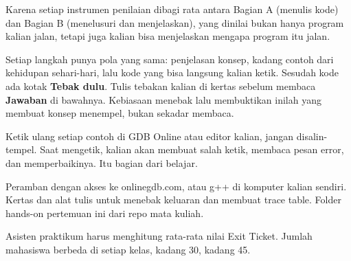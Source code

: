\documentclass[a4paper]{article}
\begin{document}
\par\vspace{4pt}\par\vspace{6pt}
Karena setiap instrumen penilaian dibagi rata antara Bagian A (menulis kode) dan Bagian B (menelusuri dan menjelaskan), yang dinilai bukan hanya program kalian jalan, tetapi juga kalian bisa menjelaskan mengapa program itu jalan.

Setiap langkah punya pola yang sama: penjelasan konsep, kadang contoh dari kehidupan sehari-hari, lalu kode yang bisa langsung kalian ketik. Sesudah kode ada kotak \textbf{Tebak dulu}. Tulis tebakan kalian di kertas sebelum membaca \textbf{Jawaban} di bawahnya. Kebiasaan menebak lalu membuktikan inilah yang membuat konsep menempel, bukan sekadar membaca.

\begin{Penting}
Ketik ulang setiap contoh di GDB Online atau editor kalian, jangan disalin-tempel. Saat mengetik, kalian akan membuat salah ketik, membaca pesan error, dan memperbaikinya. Itu bagian dari belajar.
\end{Penting}
Peramban dengan akses ke onlinegdb.com, atau g++ di komputer kalian sendiri. Kertas dan alat tulis untuk menebak keluaran dan membuat trace table. Folder hands-on pertemuan ini dari repo mata kuliah.

Asisten praktikum harus menghitung rata-rata nilai Exit Ticket. Jumlah mahasiswa berbeda di setiap kelas, kadang 30, kadang 45.
\end{document}
